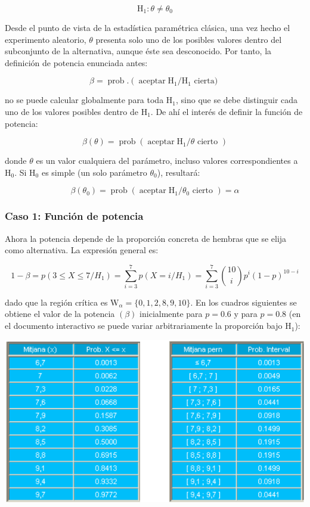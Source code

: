 \documentclass[
]{article}
\begin{document}
\[
\mathrm{H}_{1}: \theta \neq \theta_{0}
\]

Desde el punto de vista de la estadística paramétrica clásica, una vez hecho el experimento aleatorio, \(\theta\) presenta solo uno de los posibles valores dentro del subconjunto de la alternativa, aunque éste sea desconocido. Por tanto, la definición de potencia enunciada antes:

\[
\beta=\operatorname{prob} .\left(\operatorname{aceptar} \mathrm{H}_{1} / \mathrm{H}_{1}\right. \text { cierta) }
\]

no se puede calcular globalmente para toda \(\mathrm{H}_{1}\), sino que se debe distinguir cada uno de los valores posibles dentro de \(\mathrm{H}_{1}\). De ahí el interés de definir la función de potencia:

\[
\beta(\theta)=\operatorname{prob}\left(\operatorname{aceptar} \mathrm{H}_{1} / \theta \text { cierto }\right)
\]

donde \(\theta\) es un valor cualquiera del parámetro, incluso valores correspondientes a \(\mathrm{H}_{0}\). Si \(\mathrm{H}_{0}\) es simple (un solo parámetro \(\theta_{0}\)), resultará:

\[
\beta\left(\theta_{0}\right)=\operatorname{prob}\left(\operatorname{aceptar} \mathrm{H}_{1} / \theta_{0} \text { cierto }\right)=\alpha
\]

\subsubsection{Caso 1: Función de potencia}\label{caso-1-funciuxf3n-de-potencia}

Ahora la potencia depende de la proporción concreta de hembras que se elija como alternativa. La expresión general es:

\[
1-\beta=p\left(3 \leq X \leq 7 / H_{1}\right)=\sum_{i=3}^{7} p\left(X=i / H_{1}\right)=\sum_{i=3}^{7}\binom{10}{i} p^{i}(1-p)^{10-i}
\]

dado que la región crítica es \(\mathrm{W}_{\alpha}=\{0,1,2,8,9,10\}\). En los cuadros siguientes se obtiene el valor de la potencia \((\beta)\) inicialmente para \(p=0.6\) y para \(p=0.8\) (en el documento interactivo se puede variar arbitrariamente la proporción bajo \(\mathrm{H}_{1}\)):

\begin{center}\includegraphics[width=0.9\linewidth]{images/cap9-comparaProbs} \end{center}
\end{document}
